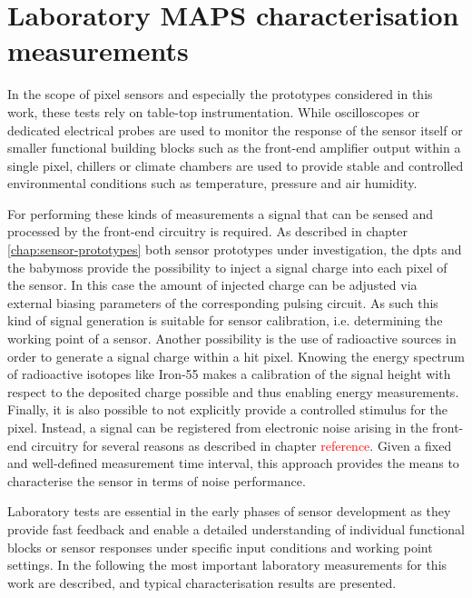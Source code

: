 %
\section{Laboratory MAPS characterisation measurements}
\label{sec:lab-measurements}
%
In the scope of pixel sensors and especially the prototypes considered in this work, these tests rely on table-top instrumentation. 
While oscilloscopes or dedicated electrical probes are used to monitor the response of the sensor itself or smaller functional building blocks such as the front-end amplifier output within a single pixel, chillers or climate chambers are used to provide stable and controlled environmental conditions such as temperature, pressure and air humidity. 

For performing these kinds of measurements a signal that can be sensed and processed by the front-end circuitry is required. 
As described in chapter \ref{chap:sensor-prototypes} both sensor prototypes under investigation, the \gls{dpts} and the \gls{babymoss} provide the possibility to inject a signal charge into each pixel of the sensor. 
In this case the amount of injected charge can be adjusted via external biasing parameters of the corresponding pulsing circuit. 
As such this kind of signal generation is suitable for sensor calibration, i.e. determining the working point of a sensor. 
Another possibility is the use of radioactive sources in order to generate a signal charge within a hit pixel. 
Knowing the energy spectrum of radioactive isotopes like Iron-55 makes a calibration of the signal height with respect to the deposited charge possible and thus enabling energy measurements. 
Finally, it is also possible to not explicitly provide a controlled stimulus for the pixel. 
Instead, a signal can be registered from electronic noise arising in the front-end circuitry for several reasons as described in chapter \textcolor{red}{reference}. 
Given a fixed and well-defined measurement time interval, this approach provides the means to characterise the sensor in terms of noise performance.

Laboratory tests are essential in the early phases of sensor development as they provide fast feedback and enable a detailed understanding of individual functional blocks or sensor responses under specific input conditions and working point settings. 
In the following the most important laboratory measurements for this work are described, and typical characterisation results are presented. 